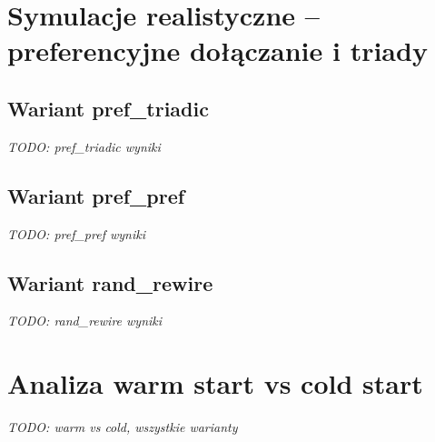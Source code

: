 \section{Symulacje realistyczne -- preferencyjne dołączanie i triady}

\subsection{Wariant pref\_triadic}

\emph{TODO: pref\_triadic wyniki}

\subsection{Wariant pref\_pref}

\emph{TODO: pref\_pref wyniki}

\subsection{Wariant rand\_rewire}

\emph{TODO: rand\_rewire wyniki}

\section{Analiza warm start vs cold start}

\emph{TODO: warm vs cold, wszystkie warianty}



